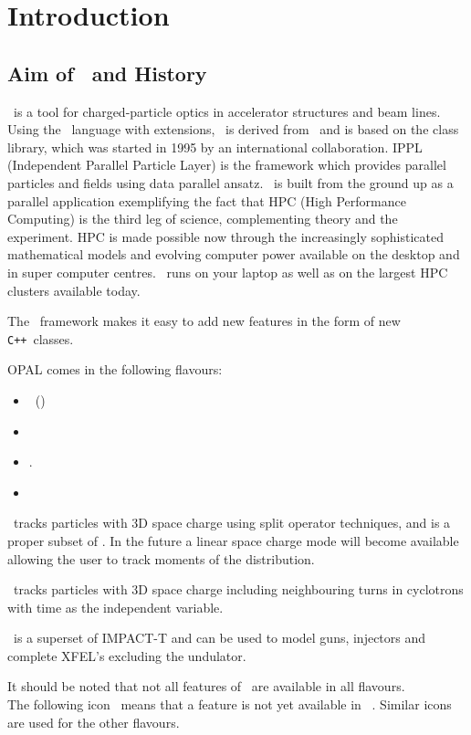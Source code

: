 \chapter{Introduction}
\label{chp:Introduction}


\section{Aim of \opal\ and History}
\opal\ is a tool for charged-particle optics in
accelerator structures and beam lines. 
Using the \mad\ language with extensions, \opal\ is derived from \madninep\ and is based 
on the
 class library,
which was started in 1995 by an international collaboration.  IPPL (Independent Parallel Particle Layer) is
the framework which provides parallel particles and fields using data parallel ansatz. 
\opal\ is built from the ground up as a parallel application exemplifying the fact that HPC (High Performance Computing) 
is the third leg of science, complementing theory and the experiment. 
HPC is made possible now through the increasingly sophisticated mathematical models and evolving computer power available on the desktop
and in super computer centres. \opal\ runs on your laptop as well as on the largest HPC clusters available today. 

The \opal\ framework makes it easy to add new features in the form of new
\texttt{C++}~classes.

OPAL comes in the following flavours:
\begin{itemize}
\item \opalmap\ (\latermore)
\item \opalcycl 
\item \opalt .
\item \opalenv
\end{itemize}

\opalmap\ tracks particles with 3D space charge using split operator techniques, and is a proper subset of \madninep. In the future 
a linear space charge mode will become available
allowing the user to track moments of the distribution. 

\opalcycl\ tracks particles with 3D space charge including neighbouring turns in cyclotrons
with time as the independent variable. 

\opalt\ is a superset of IMPACT-T \cite{qiang2005} and can be used to model guns, injectors and complete XFEL's excluding the undulator.

It should be noted that not all features of \opal\ are available in all flavours.\\ The following icon \noopalt\ means that a feature is not yet 
available in \opalt\ . Similar icons are used for the other flavours. 

